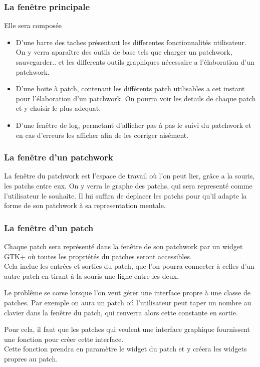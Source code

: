 \documentclass[14pt,a4paper]{article}
\begin{document}
\subsubsection{La fen\^etre principale}
Elle sera compos\'ee
\begin{itemize}
\item D'une barre des taches pr\'esentant les differentes
 fonctionnalit\'es utilisateur. On y verra apara\^itre des outils
 de base tels que charger un patchwork, sauvegarder.. et les differents
 outils graphiques n\'ecessaire a l'\'elaboration d'un patchwork.
\item D'une boite \`a patch, contenant les diff\'erents patch
 utilisables a cet instant pour l'\'elaboration d'un patchwork.
 On pourra voir les details de chaque patch et y choisir le plus adequat.
\item D'une fen\^etre de log, permetant d'afficher pas \`a pas le suivi
 du patchwork et en cas d'erreurs les afficher afin de les corriger ais\'ement.
\end{itemize}

\subsubsection{La fen\^etre d'un patchwork}
La fen\^etre du patchwork est l'espace de travail o\`u l'on peut lier,
 gr\^ace a la souris, les patchs entre eux. On y verra le graphe
 des patchs, qui sera represent\'e comme l'utilisateur le souhaite.
 Il lui suffira de deplacer les patchs pour qu'il adapte la forme de
 son patchwork \`a sa representation mentale.

\subsubsection{La fen\^etre d'un patch}
\par
Chaque patch sera repr\'esent\'e dans la fen\^etre de son patchwork par un
widget GTK+ o\`u toutes les propri\'et\'es du patches seront accessibles.\\
Cela inclue les entr\'ees et sorties du patch, que l'on pourra
connecter \`a celles d'un autre
patch en tirant \`a la souris une ligne entre les deux.\\
\par
Le probl\^eme se corse lorsque l'on veut g\'erer une interface propre \`a
une classe de patches. Par exemple on aura un patch o\'u
l'utilisateur peut taper un nombre au clavier dans la fen\^etre du patch,
qui renverra alors cette constante en sortie.\\
\par
Pour cela, il faut que les patches qui veulent une interface graphique
fournissent une fonction pour cr\'eer cette interface.\\
Cette fonction prendra en param\`etre le widget du patch et y cr\'eera
les widgets propres au patch.
\end{document}

